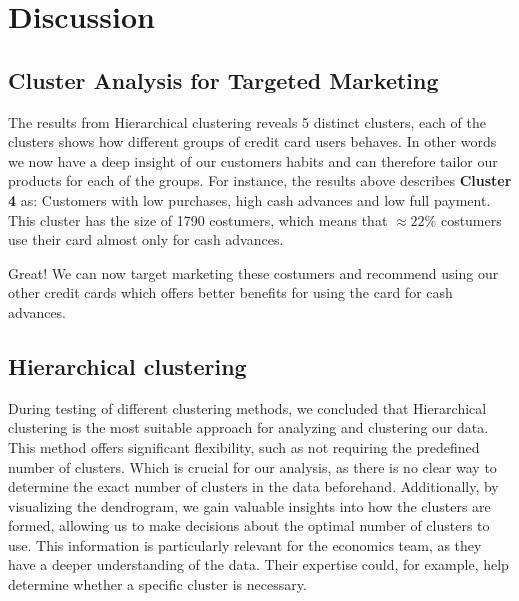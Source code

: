\section{Discussion}

\subsection{Cluster Analysis for Targeted Marketing}
The results from Hierarchical clustering reveals 5 distinct clusters, 
each of the clusters shows how different groups of credit card users behaves. 
In other words we now have a deep insight of our customers habits and can therefore tailor our products for each of the groups.
For instance, the results above describes \textbf{Cluster 4} as: Customers with low purchases, high cash advances and low full payment. 
This cluster has the size of 1790 costumers, which means that \(\approx 22\%\) costumers use their card almost only for cash advances. 
\par
Great! We can now target marketing these costumers and recommend using our other credit cards which offers better benefits for using the card for cash advances.

\subsection{Hierarchical clustering}
During testing of different clustering methods, we concluded that Hierarchical clustering is the most suitable approach for analyzing and clustering our data. 
This method offers significant flexibility, such as not requiring the predefined number of clusters. 
Which is crucial for our analysis, as there is no clear way to determine the exact number of clusters in the data beforehand.
Additionally, by visualizing the dendrogram, we gain valuable insights into how the clusters are formed, allowing us to make decisions about the optimal number of clusters to use.
This information is particularly relevant for the economics team, as they have a deeper understanding of the data. 
Their expertise could, for example, help determine whether a specific cluster is necessary.